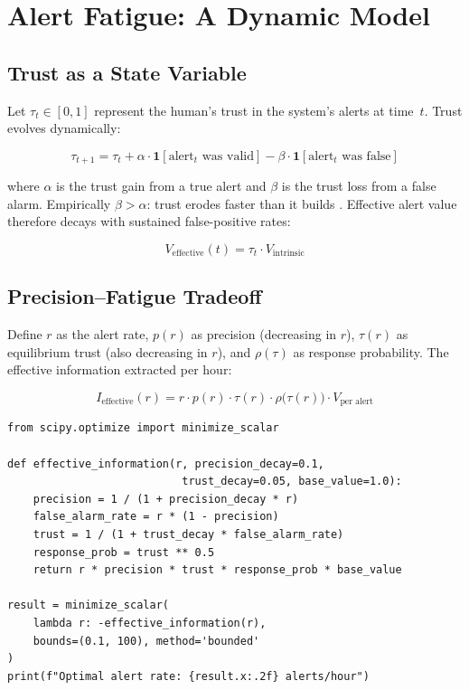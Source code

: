 \section{Alert Fatigue: A Dynamic Model}

\subsection{Trust as a State Variable}

Let $\tau_t \in [0, 1]$ represent the human's trust in the system's alerts at time~$t$. Trust evolves dynamically:

\[
\tau_{t+1} = \tau_t
  + \alpha \cdot \mathbf{1}[\text{alert}_t \text{ was valid}]
  - \beta  \cdot \mathbf{1}[\text{alert}_t \text{ was false}]
\]

where $\alpha$ is the trust gain from a true alert and $\beta$ is the trust loss from a false alarm. Empirically $\beta > \alpha$: trust erodes faster than it builds \autocite{lee2004trust}. Effective alert value therefore decays with sustained false-positive rates:

\[
V_\text{effective}(t) = \tau_t \cdot V_\text{intrinsic}
\]

\subsection{Precision--Fatigue Tradeoff}

Define $r$ as the alert rate, $p(r)$ as precision (decreasing in $r$), $\tau(r)$ as equilibrium trust (also decreasing in $r$), and $\rho(\tau)$ as response probability. The effective information extracted per hour:

\[
I_\text{effective}(r) = r \cdot p(r) \cdot \tau(r) \cdot \rho\bigl(\tau(r)\bigr) \cdot V_\text{per alert}
\]

\begin{lstlisting}[style=python, caption={Effective information vs.\ alert rate}]
from scipy.optimize import minimize_scalar

def effective_information(r, precision_decay=0.1,
                           trust_decay=0.05, base_value=1.0):
    precision = 1 / (1 + precision_decay * r)
    false_alarm_rate = r * (1 - precision)
    trust = 1 / (1 + trust_decay * false_alarm_rate)
    response_prob = trust ** 0.5
    return r * precision * trust * response_prob * base_value

result = minimize_scalar(
    lambda r: -effective_information(r),
    bounds=(0.1, 100), method='bounded'
)
print(f"Optimal alert rate: {result.x:.2f} alerts/hour")
\end{lstlisting}


